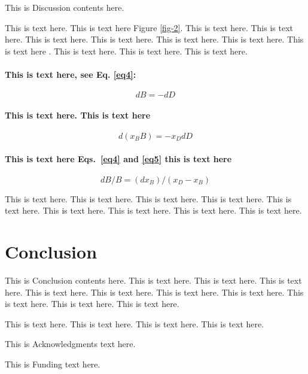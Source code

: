 \documentclass[a4paper,10pt]{edpsci} %
\begin{document}
This is Discussion contents here.
\vspace{\baselineskip}

This is text here. This is text here Figure \ref{fig-2}. This is text here. This is text here. This is text here. This is text here. This is text here. This is text here. This is text here \cite{Ref5}. This is text here. This is text here. This is text here.

\paragraph{This is text here, see Eq. \ref{eq4}:}
\begin{equation}\label{eq4}
dB = -dD
\end{equation}
\paragraph{This is text here. This is text here}
\begin{equation}\label{eq5}
d(x_B B) = -x_D  dD
\end{equation}
\paragraph{This is text here Eqs.~\ref{eq4} and \ref{eq5} this is text here}
\begin{equation}\label{eq6}
dB/B=(d x_B)/(x_D-x_B )
\end{equation}

This is text here. This is text here. This is text here. This is text here. This is text here. This is text here. This is text here. This is text here. This is text here.

\section{Conclusion}

This is Conclusion contents here.
This is text here. This is text here. This is text here. This is text here. This is text here. This is text here. This is text here. This is text here. This is text here. This is text here. 

This is text here. This is text here. This is text here. This is text here.



\acknowtext

This is Acknowledgments text here.

\funding

This is Funding text here.
\end{document}
